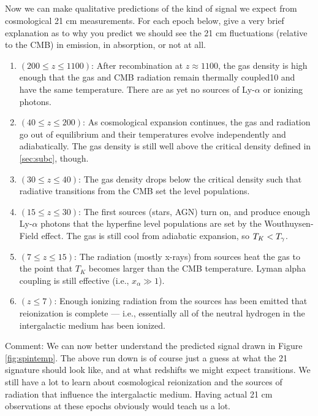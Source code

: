 \documentclass[11pt]{article}
\begin{document}
\subsection{}
Now we can make qualitative predictions of the kind of signal we expect from
cosmological 21 cm measurements. For each epoch below, give a very brief
explanation as to why you predict we should see the 21 cm fluctuations
(relative to the CMB) in emission, in absorption, or not at all.
\begin{enumerate}

\item $(200\le z\le 1100)$: After recombination at $z\approx1100$, the gas density is
high enough that the gas and CMB radiation remain thermally coupled10 and have
the same temperature. There are as yet no sources of Ly-$\alpha$ or ionizing
photons.

\item $(40\le z\le 200)$: As cosmological expansion continues, the gas and
radiation go out of equilibrium and their temperatures evolve independently and
adiabatically. The gas density is still well above the critical density defined
in \ref{sec:subc}, though.

\item $(30\le z\le 40)$: The gas density drops below the critical density such
that radiative transitions from the CMB set the level populations.

\item $(15\le z\le 30)$: The first sources (stars, AGN) turn on, and produce
enough Ly-$\alpha$ photons that the hyperfine level populations are set by the
Wouthuysen-Field effect. The gas is still cool from adiabatic expansion, so 
$T_K < {T_\gamma}$.

\item $(7\le z\le 15)$: The radiation (mostly x-rays) from sources heat the gas
to the point that $T_K$ becomes larger than the CMB temperature. Lyman alpha
coupling is still effective (i.e., $x_\alpha\gg1$).

\item $(z\le 7)$: Enough ionizing radiation from the sources has been emitted
that reionization is complete --- i.e., essentially all of the neutral hydrogen
in the intergalactic medium has been ionized.

\end{enumerate}

Comment: We can now better understand the predicted signal drawn in Figure \ref{fig:spintemp}.
The above run down is of course just a guess at what the 21 signature should
look like, and at what redshifts we might expect transitions. We still have a
lot to learn about cosmological reionization and the sources of radiation
that influence the intergalactic medium. Having actual 21 cm observations at
these epochs obviously would teach us a lot.
\end{document}
